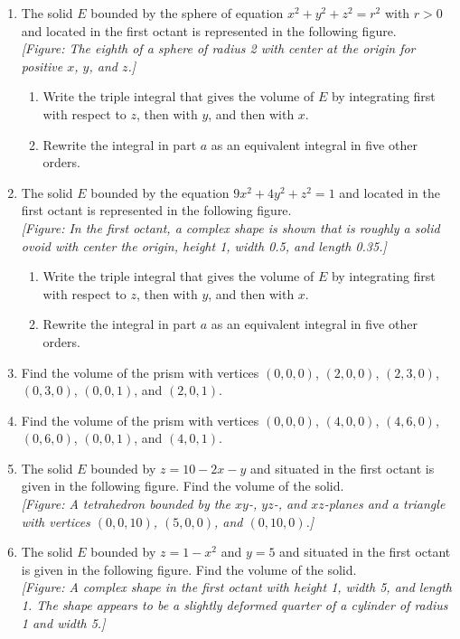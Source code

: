 \documentclass{exercises}
\begin{document}
\begin{enumerate}[resume]
\begin{enumerate}[label=(\alph*)]
\end{enumerate}
\item The solid $E$ bounded by the sphere of equation $x^{2}+y^{2}+z^{2}=r^{2}$ with $r>0$ and located in the first octant is represented in the following figure. \\ \textit{[Figure: The eighth of a sphere of radius 2 with center at the origin for positive $x$, $y$, and $z$.]}
\begin{enumerate}[label=(\alph*)]
  \item Write the triple integral that gives the volume of $E$ by integrating first with respect to $z$, then with $y$, and then with $x$.
  \item Rewrite the integral in part $a$ as an equivalent integral in five other orders.
\end{enumerate}
\item The solid $E$ bounded by the equation $9x^{2}+4y^{2}+z^{2}=1$ and located in the first octant is represented in the following figure. \\ \textit{[Figure: In the first octant, a complex shape is shown that is roughly a solid ovoid with center the origin, height 1, width 0.5, and length 0.35.]}
\begin{enumerate}[label=(\alph*)]
  \item Write the triple integral that gives the volume of $E$ by integrating first with respect to $z$, then with $y$, and then with $x$.
  \item Rewrite the integral in part $a$ as an equivalent integral in five other orders.
\end{enumerate}
\item Find the volume of the prism with vertices $(0,0,0)$, $(2,0,0)$, $(2,3,0)$, $(0,3,0)$, $(0,0,1)$, and $(2,0,1)$.
\item Find the volume of the prism with vertices $(0,0,0)$, $(4,0,0)$, $(4,6,0)$, $(0,6,0)$, $(0,0,1)$, and $(4,0,1)$.
\item The solid $E$ bounded by $z=10-2x-y$ and situated in the first octant is given in the following figure. Find the volume of the solid. \\ \textit{[Figure: A tetrahedron bounded by the $xy$-, $yz$-, and $xz$-planes and a triangle with vertices $(0,0,10)$, $(5,0,0)$, and $(0,10,0)$.]}
\item The solid $E$ bounded by $z=1-x^{2}$ and $y=5$ and situated in the first octant is given in the following figure. Find the volume of the solid. \\ \textit{[Figure: A complex shape in the first octant with height 1, width 5, and length 1. The shape appears to be a slightly deformed quarter of a cylinder of radius 1 and width 5.]}

\end{enumerate}
\end{document}

